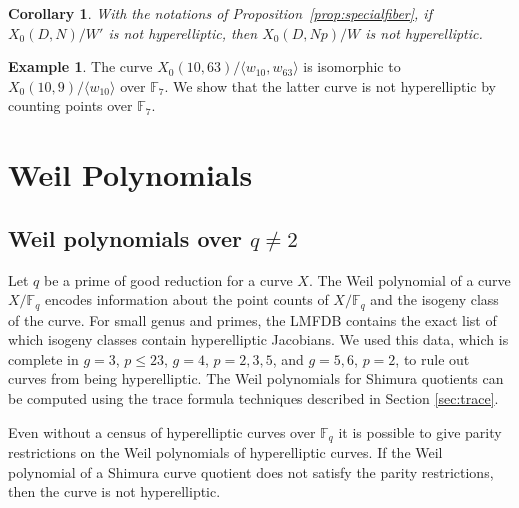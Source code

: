 \documentclass[12pt]{amsart}
\newcommand{\F}{\mathbb{F}}
\numberwithin{equation}{subsection}
\theoremstyle{plain}\newtheorem{ithm}{Theorem}
\theoremstyle{plain}\newtheorem{iprop}[ithm]{Proposition}
\newtheorem{corollary}[equation]{Corollary}
\theoremstyle{definition}
\newtheorem{example}[equation]{Example}
\theoremstyle{remark}
\newcommand{\Curve}[2]{X_0({#1},{#2})} %
\begin{document}
\begin{corollary}
\label{cor:specialfiber}
With the notations of Proposition~\ref{prop:specialfiber},
if $\Curve{D}{N}/W'$ is not hyperelliptic, then $\Curve{D}{Np}/W$ is not hyperelliptic.
\end{corollary}

\begin{example}
The curve $\Curve{10}{63}/ \langle w_{10}, w_{63} \rangle$ is isomorphic to $\Curve{10}{9}/ \langle w_{10} \rangle $ over $\F_7$. 
We show that the latter curve is not hyperelliptic by counting points over $\F_7$.
\end{example}

\section{Weil Polynomials}
\label{sec:Weilpolys}


\subsection{Weil polynomials over \texorpdfstring{$q \neq 2$}{q ne 2}}
Let $q$ be a prime of good reduction for a curve $X$. The Weil polynomial of a curve $X/\F_q$ encodes information about the point counts of $X/\F_q$ and the isogeny class of the curve. For small genus and primes, the LMFDB \cite{lmfdb} contains the exact list of which isogeny classes contain hyperelliptic Jacobians. 
We used this data, which is complete in $g = 3$, $p \leq 23$, $g = 4$, $p = 2, 3, 5$, and $g = 5,6$, $p = 2$, to rule out curves from being hyperelliptic. The Weil polynomials for Shimura quotients can be computed using the trace formula techniques described in Section \ref{sec:trace}.

Even without a census of hyperelliptic curves over $\F_q$ it is possible to give parity restrictions on the Weil polynomials of hyperelliptic curves. If the Weil polynomial of a Shimura curve quotient does not satisfy the  parity restrictions, then the curve is not hyperelliptic. 
\end{document}
